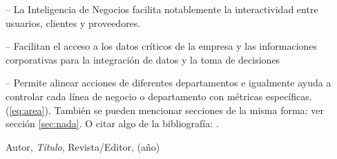  – La Inteligencia de Negocios facilita notablemente la interactividad entre usuarios, clientes y proveedores.

 – Facilitan el acceso a los datos críticos de la empresa y las informaciones corporativas para la integración de datos y la toma de decisiones

 – Permite alinear acciones de diferentes departamentos e igualmente ayuda a controlar cada línea de negocio o departamento con métricas específicas.
 \\

(\ref{eq:area}).
También se pueden mencionar secciones de la misma forma: ver sección
\ref{sec:nada}. O citar algo de la bibliografía: \cite{Cd94}.


\begin{thebibliography}{99}

 Autor, \emph{Título}, Revista/Editor, (año)

\end{thebibliography}


